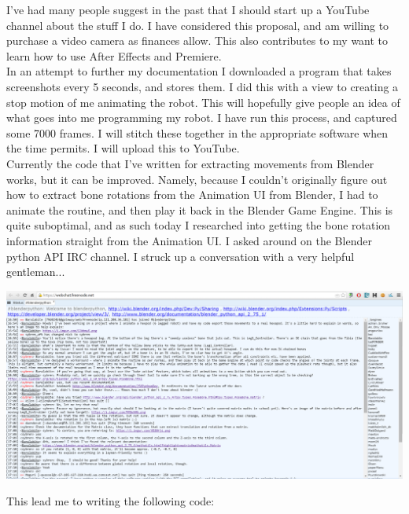     		I've had many people suggest in the past that I should start up a YouTube channel about the stuff I do. I have considered this proposal, and am willing to purchase a video camera as finances allow. This also contributes to my want to learn how to use After Effects and Premiere.\\
    		
    		In an attempt to further my documentation I downloaded a program that takes screenshots every 5 seconds, and stores them. I did this with a view to creating a stop motion of me animating the robot. This will hopefully give people an idea of what goes into me programming my robot. I have run this process, and captured some 7000 frames. I will stitch these together in the appropriate software when the time permits. I will upload this to YouTube.\\
    		
    		Currently the code that I've written for extracting movements from Blender works, but it can be improved. Namely, because I couldn't originally figure out how to extract bone rotations from the Animation UI from Blender, I had to animate the routine, and then play it back in the Blender Game Engine. This is quite suboptimal, and as such today I researched into getting the bone rotation information straight from the Animation UI. I asked around on the Blender python API IRC channel. I struck up a conversation with a very helpful gentleman...\\
    		
    		\centerline{\includegraphics[width=\linewidth]{images/blender_irc}}
    		\vspace{10pt}
    		
    		This lead me to writing the following code:
    		
